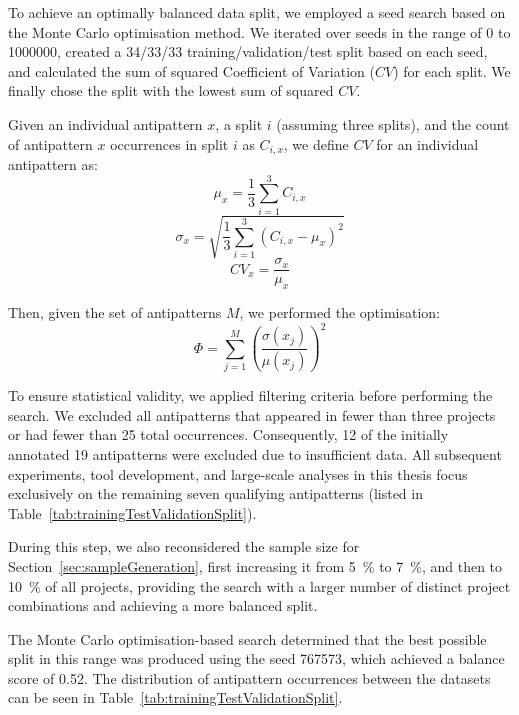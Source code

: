 To achieve an optimally balanced data split, we employed a seed search based on the Monte Carlo optimisation method. We iterated over seeds in the range of \num{0} to \num{1000000}, created a \num{34}/\num{33}/\num{33} training/validation/test split based on each seed, and calculated the sum of squared Coefficient of Variation (\(CV\)) for each split. We finally chose the split with the lowest sum of squared \(CV\).

Given an individual antipattern \(x\), a split \(i\) (assuming three splits), and the count of antipattern \(x\) occurrences in split \(i\) as \(C_{i,x}\), we define \(CV\) for an individual antipattern as:
\begin{equation}
\mu_x = \frac{1}{3} \sum_{i=1}^{3} C_{i,x}
\end{equation}
\begin{equation}
\sigma_x = \sqrt{\frac{1}{3} \sum_{i=1}^{3} (C_{i,x} - \mu_x)^2}
\end{equation}
\begin{equation}
CV_x = \frac{\sigma_x}{\mu_x}
\end{equation}

Then, given the set of antipatterns \(M\), we performed the optimisation:
\begin{equation}
\Phi = \sum_{j=1}^{M} \left( \frac{\sigma(x_j)}{\mu(x_j)} \right)^2
\end{equation}

To ensure statistical validity, we applied filtering criteria before performing the search. We excluded all antipatterns that appeared in fewer than three projects or had fewer than \num{25} total occurrences. Consequently, 12 of the initially annotated 19 antipatterns were excluded due to insufficient data. All subsequent experiments, tool development, and large-scale analyses in this thesis focus exclusively on the remaining seven qualifying antipatterns (listed in Table~\ref{tab:trainingTestValidationSplit}).

During this step, we also reconsidered the sample size for Section~\ref{sec:sampleGeneration}, first increasing it from \qty{5}{\percent} to \qty{7}{\percent}, and then to \qty{10}{\percent} of all projects, providing the search with a larger number of distinct project combinations and achieving a more balanced split.

The Monte Carlo optimisation-based search determined that the best possible split in this range was produced using the seed \num{767573}, which achieved a balance score of \num{0.52}. The distribution of antipattern occurrences between the datasets can be seen in Table~\ref{tab:trainingTestValidationSplit}.

